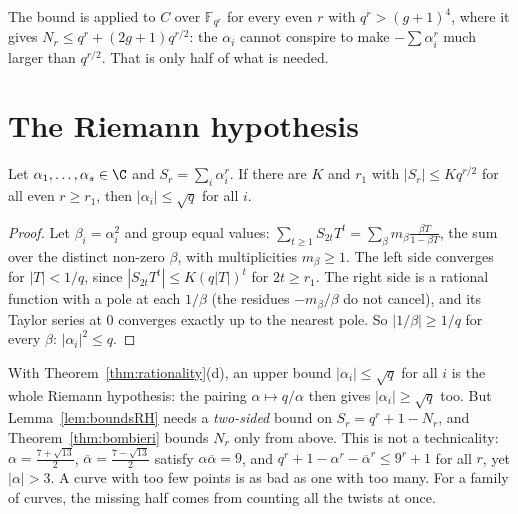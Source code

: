 The bound is applied to $C$ over $\mathbb F_{q^r}$ for every even $r$ with $q^r>(g+1)^4$, where it gives $N_r\le q^r+(2g+1)q^{r/2}$: the $\alpha_i$ cannot conspire to make
$-\sum\alpha_i^r$ much larger than $q^{r/2}$. That is only half of what is needed.

\section{The Riemann hypothesis}

\begin{lemma}\label{lem:boundsRH}
Let $\alpha_1,\dots,\alpha_s\in\C$ and $S_r=\sum_i\alpha_i^r$. If there are $K$ and $r_1$ with $|S_r|\le Kq^{r/2}$ for all even $r\ge r_1$, then $|\alpha_i|\le\sqrt q$
for all $i$.
\end{lemma}
\begin{proof}
Let $\beta_i=\alpha_i^2$ and group equal values: $\sum_{t\ge1}S_{2t}T^t=\sum_\beta m_\beta\frac{\beta T}{1-\beta T}$, the sum over the distinct non-zero $\beta$, with
multiplicities $m_\beta\ge1$. The left side converges for $|T|<1/q$, since $|S_{2t}T^t|\le K(q|T|)^t$ for $2t\ge r_1$. The right side is a rational function with a
pole at each $1/\beta$ (the residues $-m_\beta/\beta$ do not cancel), and its Taylor series at $0$ converges exactly up to the nearest pole. So $|1/\beta|\ge1/q$ for
every $\beta$: $|\alpha_i|^2\le q$.
\end{proof}

With Theorem~\ref{thm:rationality}(d), an upper bound $|\alpha_i|\le\sqrt q$ for all $i$ is the whole Riemann hypothesis: the pairing $\alpha\mapsto q/\alpha$ then gives
$|\alpha_i|\ge\sqrt q$ too. But Lemma~\ref{lem:boundsRH} needs a \emph{two-sided} bound on $S_r=q^r+1-N_r$, and Theorem~\ref{thm:bombieri} bounds $N_r$ only from above.
This is not a technicality: $\alpha=\frac{7+\sqrt{13}}2$, $\overline\alpha=\frac{7-\sqrt{13}}2$ satisfy $\alpha\overline\alpha=9$, and $q^r+1-\alpha^r-\overline\alpha^r\le9^r+1$
for all $r$, yet $|\alpha|>3$. A curve with too few points is as bad as one with too many. For a family of curves, the missing half comes from counting
all the twists at once.

